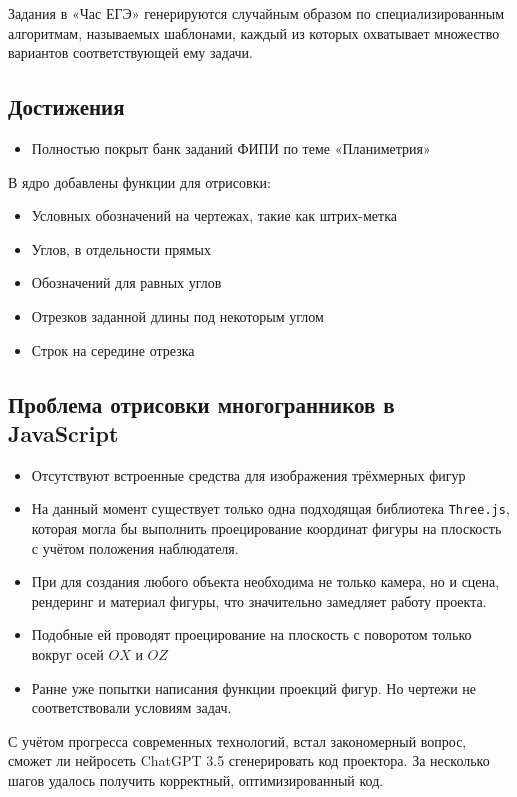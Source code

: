 \documentclass[a4paper, 12pt]{extarticle}
\begin{document}
Задания в «Час ЕГЭ» генерируются случайным образом по специализированным алгоритмам, называемых шаблонами, каждый из которых охватывает множество вариантов соответствующей ему задачи.

\subsection*{Достижения}
\begin{itemize}
	\item Полностью покрыт банк заданий ФИПИ по теме «Планиметрия»
\end{itemize}
В ядро добавлены функции для отрисовки:
\begin{itemize}
	\item Условных обозначений на чертежах, такие как штрих-метка
	\item Углов, в отдельности прямых
	\item Обозначений для равных углов
	\item Отрезков заданной длины под некоторым углом
	\item Строк на середине отрезка
\end{itemize}

\subsection*{Проблема отрисовки многогранников в JavaScript}

\begin{itemize}
	\item Отсутствуют встроенные средства для изображения трёхмерных фигур
	\item На данный момент существует только одна подходящая библиотека \texttt{Three.js}, которая могла бы выполнить проецирование координат фигуры на плоскость с учётом положения наблюдателя.
	\item При для создания любого объекта необходима не только камера, но и сцена, рендеринг и материал фигуры, что значительно замедляет работу проекта.
	\item Подобные ей проводят проецирование на плоскость с поворотом только вокруг осей $OX$ и $OZ$
	\item Ранне уже попытки написания функции проекций фигур. Но чертежи не соответствовали условиям задач.
\end{itemize}

С учётом прогресса современных технологий, встал закономерный вопрос, сможет ли нейросеть ChatGPT 3.5 сгенерировать код проектора.
За несколько шагов удалось получить корректный, оптимизированный код.
\end{document}

